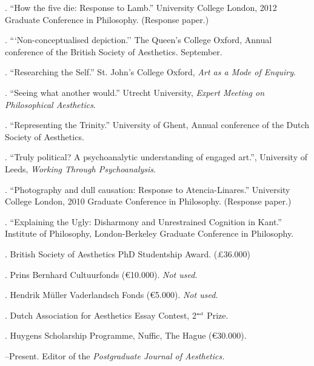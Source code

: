 \documentclass[11pt]{article}
\begin{document}
\medskip

. ``How the five die: Response to Lamb.'' University College London, 2012 Graduate Conference in Philosophy. (Response paper.)

. ```Non-conceptualised depiction.'' The Queen's College Oxford, Annual conference of the British Society of Aesthetics. September.

. ``Researching the Self.'' St. John's College Oxford, \emph{Art as a Mode of Enquiry}.

. ``Seeing what another would.'' Utrecht University, \emph{Expert Meeting on Philosophical Aesthetics}.

. ``Representing the Trinity.'' University of Ghent, Annual conference of the Dutch Society of Aesthetics.

. ``Truly political? A psychoanalytic understanding of engaged art.'', University of Leeds, \emph{Working Through Psychoanalysis}.

. ``Photography and dull causation: Response to Atencia-Linares.'' University College London, 2010 Graduate Conference in Philosophy. (Response paper.)

. ``Explaining the Ugly: Disharmony and Unrestrained Cognition in Kant.'' Institute of Philosophy, London-Berkeley Graduate Conference in Philosophy.

\bigskip

\medskip

. British Society of Aesthetics PhD Studentship Award. (£36.000)

. Prins Bernhard Cultuurfonds (€10.000). \emph{Not used.}

. Hendrik Müller Vaderlandsch Fonds (€5.000). \emph{Not used.} 

. Dutch Association for Aesthetics Essay Contest, 2$^{\textrm{\tiny{nd}}}$ Prize.

. Huygens Scholarship Programme, Nuffic, The Hague (€30.000).

\bigskip 

\medskip

\medskip

--Present. Editor of the \emph{Postgraduate Journal of Aesthetics.}
\end{document}
